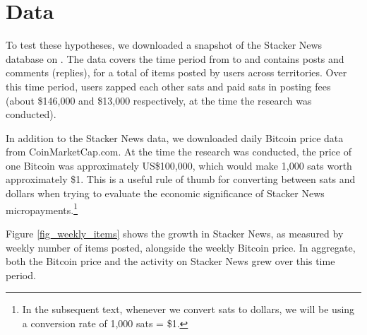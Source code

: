 \section{Data} \label{sec_data}

To test these hypotheses, we downloaded a snapshot of the Stacker News database on . The data covers the time period from  to  and contains  posts and  comments (replies), for a total of  items posted by  users across  territories. Over this time period, users zapped each other  sats and paid  sats in posting fees (about \$146,000 and \$13,000 respectively, at the time the research was conducted). 

In addition to the Stacker News data, we downloaded daily Bitcoin price data from CoinMarketCap.com. At the time the research was conducted, the price of one Bitcoin was approximately US\$100,000, which would make 1,000 sats worth approximately \$1. This is a useful rule of thumb for converting between sats and dollars when trying to evaluate the economic significance of Stacker News micropayments.\footnote{In the subsequent text, whenever we convert sats to dollars, we will be using a conversion rate of 1,000 sats = \$1.}

Figure \ref{fig_weekly_items} shows the growth in Stacker News, as measured by weekly number of items posted, alongside the weekly Bitcoin price. In aggregate, both the Bitcoin price and the activity on Stacker News grew over this time period. 


